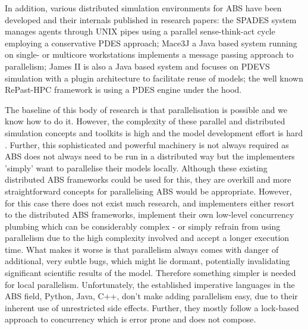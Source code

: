 In addition, various distributed simulation environments for ABS have been developed and their internals published in research papers: the SPADES system \cite{riley_next_2003} manages agents through UNIX pipes using a parallel sense-think-act cycle employing a conservative PDES approach; Mace3J \cite{gasser_mace3j:_2002} a Java based system running on single- or multicore workstations implements a message passing approach to parallelism; James II \cite{himmelspach_plugn_2007} is also a Java based system and focuses on PDEVS simulation with a plugin architecture to facilitate reuse of models; the well known RePast-HPC \cite{minson_distributing_2008, gorur_repast_2016} framework is using a PDES engine under the hood. 

The baseline of this body of research is that parallelisation is possible and we know how to do it. However, the complexity of these parallel and distributed simulation concepts and toolkits is high and the model development effort is hard \cite{abar_agent_2017}. Further, this sophisticated and powerful machinery is not always required as ABS does not always need to be run in a distributed way but the implementers 'simply' want to parallelise their models locally. Although these existing distributed ABS frameworks could be used for this, they are overkill and more straightforward concepts for parallelising ABS would be appropriate. However, for this case there does not exist much research, and implementers either resort to the distributed ABS frameworks, implement their own low-level concurrency plumbing which can be considerably complex - or simply refrain from using parallelism due to the high complexity involved and accept a longer execution time. What makes it worse is that parallelism always comes with danger of additional, very subtle bugs, which might lie dormant, potentially invalidating significant scientific results of the model. Therefore something simpler is needed for local parallelism. Unfortunately, the established imperative languages in the ABS field, Python, Java, C++, don't make adding parallelism easy, due to their inherent use of unrestricted side effects. Further, they mostly follow a lock-based approach to concurrency which is error prone and does not compose. %

\medskip


